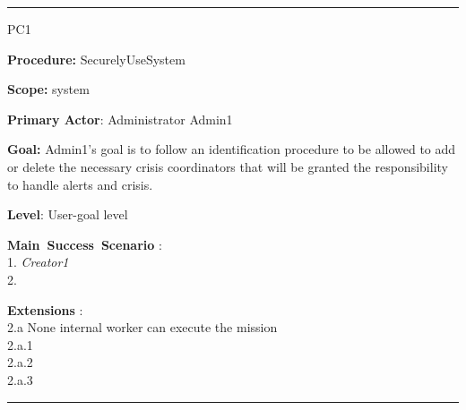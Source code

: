 \hrule
\begin{lyxlist}{PC1}
\small{
\item [\textbf{Procedure:}] SecurelyUseSystem
\item [\textbf{Scope:}] system
\item [\textbf{Primary Actor}:] Administrator Admin1
\item [\textbf{Goal:}] Admin1’s goal is to follow an
identification procedure to be allowed to add or delete the necessary crisis
coordinators that will be granted the responsibility to handle alerts and crisis.
\item [\textbf{Level}:] User-goal level
\item [\textbf{Main~Success~Scenario}]:\\
1. \emph{Creator1} \\
2. 


\item [\textbf{Extensions}]:\\
2.a None internal worker can execute the mission\\
\hspace*{0.5cm} 2.a.1 \\
\hspace*{0.5cm} 2.a.2 \\
\hspace*{0.5cm} 2.a.3 \\

}

\end{lyxlist}
\hrule

